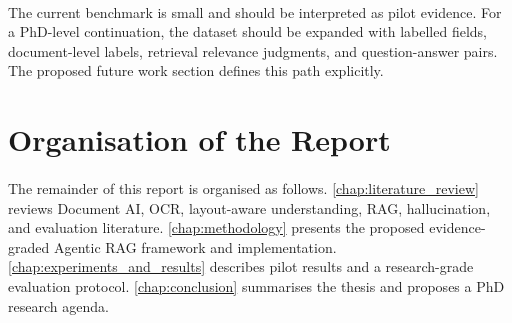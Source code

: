 \paragraph{} The current benchmark is small and should be interpreted as pilot evidence. For a PhD-level continuation, the dataset should be expanded with labelled fields, document-level labels, retrieval relevance judgments, and question-answer pairs. The proposed future work section defines this path explicitly.

\section{Organisation of the Report}
\paragraph{} The remainder of this report is organised as follows. \cref{chap:literature_review} reviews Document AI, OCR, layout-aware understanding, RAG, hallucination, and evaluation literature. \cref{chap:methodology} presents the proposed evidence-graded Agentic RAG framework and implementation. \cref{chap:experiments_and_results} describes pilot results and a research-grade evaluation protocol. \cref{chap:conclusion} summarises the thesis and proposes a PhD research agenda.
